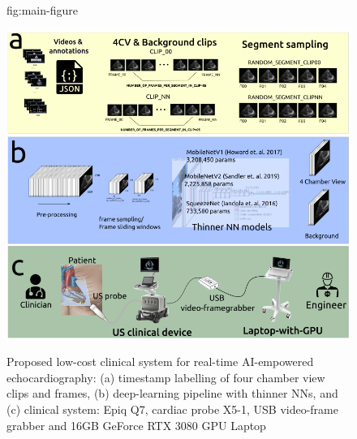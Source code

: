 \documentclass[mlabstract,twocolumn]{jmlr}
\begin{document}
\begin{figure}[htbp]
\floatconts
  {fig:main-figure}
  {\caption{
      Proposed low-cost clinical system for real-time AI-empowered echocardiography:
      (a) timestamp labelling of four chamber view clips and frames,
      (b) deep-learning pipeline with thinner NNs, and
      (c) clinical system: Epiq Q7, cardiac probe X5-1, USB video-frame grabber and 16GB GeForce RTX 3080 GPU Laptop
    }
  }
  {\includegraphics[width=\columnwidth]{../figures/main-figure/versions/drawing-v02}}%
\end{figure}
\end{document}
